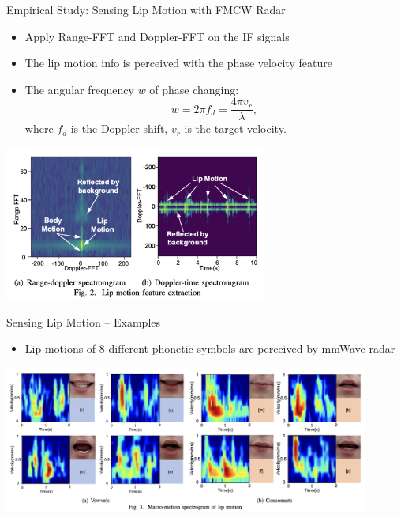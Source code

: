 \documentclass[dvipsnames, handout]{beamer}
\newcommand{\1}{\mathds{1}}	%
\begin{document}
\begin{frame}[t]{Empirical Study: Sensing Lip Motion with FMCW Radar}

\begin{itemize}
\item Apply Range-FFT and Doppler-FFT on the IF signals
\item The lip motion info is perceived with the phase velocity feature
\item The angular frequency $w$ of phase changing:
$$w = 2\pi f_d = \frac{4\pi v_r}{\lambda}, $$
where $f_d$ is the Doppler shift, $v_r$ is the target velocity.
\end{itemize}

\begin{center}
\includegraphics[width=0.65\textwidth]{imgs/mmmic-fig2.png}
\end{center}

\end{frame}

\begin{frame}[t]{Sensing Lip Motion -- Examples}
\begin{itemize}
\item Lip motions of 8 different phonetic symbols are perceived by mmWave radar
\end{itemize}
\begin{center}
\includegraphics[width=0.9\textwidth]{imgs/mmmic-fig3.png}
\end{center}
\end{frame}
\end{document}
